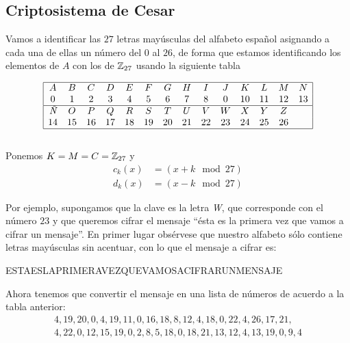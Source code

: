 \subsection*{Criptosistema de Cesar}

Vamos a identificar las $27$ letras mayúsculas del alfabeto español asignando a cada una de ellas un número del $0$ al $26$, de forma que estamos identificando los elementos de $A$ con los de $\mathbb{Z}_{27}$ usando la siguiente tabla

\begin{equation}
    \begin{array}{|cccccccccccccc|}\hline
        A & B & C & D & E & F & G & H & I & J & K  & L  & M  & N \\
        0 & 1 & 2 & 3 & 4 & 5 & 6 & 7 & 8 & 0 & 10 & 11 & 12 & 13 \\ \hline
        \text{\it Ñ} & O  & P  & Q  & R  & S  & T  & U  & V  & W  & X  & Y  & Z & \\
                  14 & 15 & 16 & 17 & 18 & 19 & 20 & 21 & 22 & 23 & 24 & 25 & 26 & \\ \hline
    \end{array}
\end{equation}
\\
Ponemos $K=M=C=\mathbb{Z}_{27}$ y 
\begin{equation*}
    \begin{split}
        c_k(x) &= ( x + k \mod 27 ) \\
        d_k(x) &= ( x - k \mod 27 )
    \end{split}
\end{equation*}

Por ejemplo, supongamos que la clave es la letra \textit{W}, que corresponde con el número $23$ y que queremos cifrar el mensaje ``ésta es la primera vez que vamos a cifrar un mensaje''. En primer lugar obsérvese que nuestro alfabeto sólo contiene letras mayúsculas sin acentuar, con lo que el mensaje a cifrar es:

\begin{center}
    ESTAESLAPRIMERAVEZQUEVAMOSACIFRARUNMENSAJE
\end{center}

Ahora tenemos que convertir el mensaje en una lista de números de acuerdo a la tabla anterior:
\begin{gather*}
    4, 19, 20, 0, 4, 19, 11, 0, 16, 18, 8, 12, 4, 18, 0, 22, 4, 26, 17, 21, \\ 4, 22, 0, 12, 15, 19, 0, 2, 8, 5, 18, 0, 18, 21, 13, 12, 4, 13, 19, 0, 9, 4
\end{gather*}

